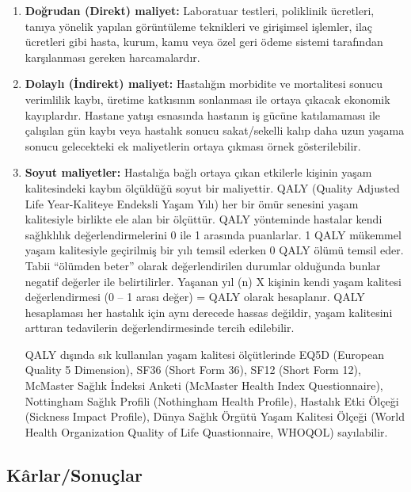 \begin{enumerate}[1.]\itemsep-6pt
\item \textbf{Doğrudan (Direkt) maliyet:} Laboratuar testleri, poliklinik ücretleri, tanıya yönelik yapılan görüntüleme teknikleri ve girişimsel işlemler, ilaç ücretleri gibi hasta, kurum, kamu veya özel geri ödeme sistemi tarafından karşılanması gereken harcamalardır.
\item \textbf{Dolaylı (İndirekt) maliyet:} Hastalığın morbidite ve mortalitesi sonucu verimlilik kaybı, üretime katkısının sonlanması ile ortaya çıkacak ekonomik kayıplardır. Hastane yatışı esnasında hastanın iş gücüne katılamaması ile çalışılan gün kaybı veya hastalık sonucu sakat/sekelli kalıp daha uzun yaşama sonucu gelecekteki ek maliyetlerin ortaya çıkması örnek gösterilebilir.
\item \textbf{Soyut maliyetler:} Hastalığa bağlı ortaya çıkan etkilerle kişinin yaşam kalitesindeki kaybın ölçüldüğü soyut bir maliyettir. QALY (Quality Adjusted Life Year-Kaliteye Endeksli Yaşam Yılı) her bir ömür senesini yaşam kalitesiyle birlikte ele alan bir ölçüttür. QALY yönteminde hastalar kendi sağlıklılık değerlendirmelerini 0 ile 1 arasında puanlarlar. 1 QALY mükemmel yaşam kalitesiyle geçirilmiş bir yılı temsil ederken 0 QALY ölümü temsil eder. Tabii “ölümden beter” olarak değerlendirilen durumlar olduğunda bunlar negatif değerler ile belirtilirler. 
Yaşanan yıl (n) X kişinin kendi yaşam kalitesi değerlendirmesi (0 – 1 arası değer) = QALY olarak hesaplanır. 
QALY hesaplaması her hastalık için aynı derecede hassas değildir, yaşam kalitesini arttıran tedavilerin değerlendirmesinde tercih edilebilir.

QALY dışında sık kullanılan yaşam kalitesi ölçütlerinde EQ5D (European Quality 5 Dimension), SF36 (Short Form 36), SF12 (Short Form 12), McMaster Sağlık İndeksi Anketi (McMaster Health Index Questionnaire), Nottingham Sağlık Profili (Nothingham Health Profile), Hastalık Etki Ölçeği (Sickness Impact Profile), Dünya Sağlık Örgütü Yaşam Kalitesi Ölçeği (World Health Organization Quality of Life Quastionnaire, WHOQOL) sayılabilir. 
\end{enumerate}


\subsection{Kârlar/Sonuçlar}

